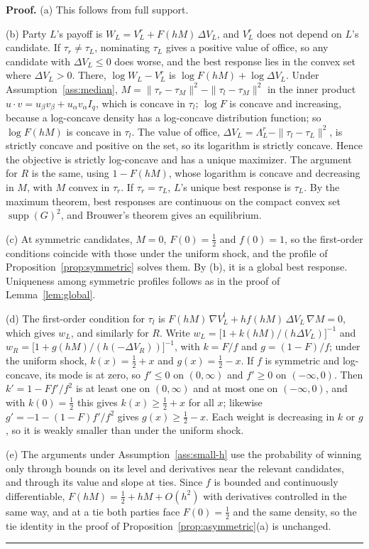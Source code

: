 \documentclass[12pt,letterpaper]{article}
\newenvironment{proof}[1][Proof]{\noindent\textbf{#1.} }{\ \rule{0.5em}{0.5em}}
\begin{document}
\begin{proof}
(a) This follows from full support.

(b) Party $L$'s payoff is $W_L=V_L^r+F(hM)\,\Delta V_L$, and $V_L^r$ does not depend on $L$'s candidate. If $\tau_r\ne\tau_L$, nominating $\tau_L$ gives a positive value of office, so any candidate with $\Delta V_L\le0$ does worse, and the best response lies in the convex set where $\Delta V_L>0$. There, $\log W_L-V_L^r$ is $\log F(hM)+\log\Delta V_L$. Under Assumption~\ref{ass:median}, $M=\|\tau_r-\tau_M\|^2-\|\tau_l-\tau_M\|^2$ in the inner product $u\cdot v=u_\beta v_\beta+u_\alpha v_\alpha I_q$, which is concave in $\tau_l$; $\log F$ is concave and increasing, because a log-concave density has a log-concave distribution function; so $\log F(hM)$ is concave in $\tau_l$. The value of office, $\Delta V_L=\Lambda_L^r-\|\tau_l-\tau_L\|^2$, is strictly concave and positive on the set, so its logarithm is strictly concave. Hence the objective is strictly log-concave and has a unique maximizer. The argument for $R$ is the same, using $1-F(hM)$, whose logarithm is concave and decreasing in $M$, with $M$ convex in $\tau_r$. If $\tau_r=\tau_L$, $L$'s unique best response is $\tau_L$. By the maximum theorem, best responses are continuous on the compact convex set $\operatorname{supp}(G)^2$, and Brouwer's theorem gives an equilibrium.

(c) At symmetric candidates, $M=0$, $F(0)=\tfrac12$ and $f(0)=1$, so the first-order conditions coincide with those under the uniform shock, and the profile of Proposition~\ref{prop:symmetric} solves them. By (b), it is a global best response. Uniqueness among symmetric profiles follows as in the proof of Lemma~\ref{lem:global}.

(d) The first-order condition for $\tau_l$ is $F(hM)\,\nabla V_L^l+hf(hM)\,\Delta V_L\,\nabla M=0$, which gives $w_L$, and similarly for $R$. Write $w_L=\big[1+k(hM)/(h\Delta V_L)\big]^{-1}$ and $w_R=\big[1+g(hM)/(h(-\Delta V_R))\big]^{-1}$, with $k=F/f$ and $g=(1-F)/f$; under the uniform shock, $k(x)=\tfrac12+x$ and $g(x)=\tfrac12-x$. If $f$ is symmetric and log-concave, its mode is at zero, so $f'\le0$ on $(0,\infty)$ and $f'\ge0$ on $(-\infty,0)$. Then $k'=1-Ff'/f^2$ is at least one on $(0,\infty)$ and at most one on $(-\infty,0)$, and with $k(0)=\tfrac12$ this gives $k(x)\ge\tfrac12+x$ for all $x$; likewise $g'=-1-(1-F)f'/f^2$ gives $g(x)\ge\tfrac12-x$. Each weight is decreasing in $k$ or $g$, so it is weakly smaller than under the uniform shock.

(e) The arguments under Assumption~\ref{ass:small-h} use the probability of winning only through bounds on its level and derivatives near the relevant candidates, and through its value and slope at ties. Since $f$ is bounded and continuously differentiable, $F(hM)=\tfrac12+hM+O(h^2)$ with derivatives controlled in the same way, and at a tie both parties face $F(0)=\tfrac12$ and the same density, so the tie identity in the proof of Proposition~\ref{prop:asymmetric}(a) is unchanged.
\end{proof}
\end{document}
